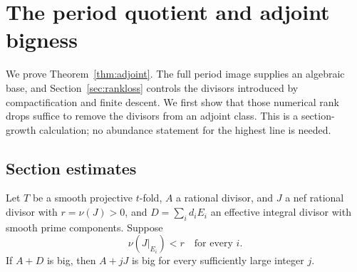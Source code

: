 \section{The period quotient and adjoint bigness}\label{sec:quotient}\label{altord:sec:period}
We prove Theorem~\ref{thm:adjoint}. The full period image supplies
an algebraic base, and Section~\ref{sec:rankloss} controls the divisors
introduced by compactification and finite descent. We first show
that those numerical rank drops suffice to remove the divisors
from an adjoint class. This is a section-growth calculation; no
abundance statement for the highest line is needed.

\subsection{Section estimates}\label{altord:sec:estimates}
\begin{lemma}\label{altord:e:volume-lemma}
Let \(T\) be a smooth projective \(t\)-fold, \(A\) a rational divisor,
and \(J\) a nef rational divisor
with \(r=\nu(J)>0\), and \(D=\sum_i d_iE_i\) an effective integral divisor
with smooth prime components. Suppose
\[
 \nu(J|_{E_i})<r\quad\text{for every }i.
\]
If \(A+D\) is big, then \(A+jJ\) is big for every sufficiently large integer
\(j\).
\end{lemma}


